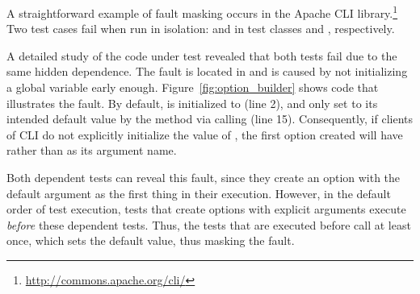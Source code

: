 A straightforward example of fault masking occurs in the Apache CLI
library.\footnote{\url{http://commons.apache.org/cli/}}
Two test cases fail when run in isolation:
 and  in test
classes  and ,
respectively.

A detailed study of the code under test revealed that both 
tests fail due to the same hidden dependence. The fault is located in 
 and is caused by not initializing a global
variable early enough.
Figure~\ref{fig:option_builder} shows code that
illustrates the fault. 
%
By default,
 is initialized to  (line 2), and only set to
its intended default value  by the  method
via calling  (line 15). 
Consequently, if clients of CLI do not explicitly initialize the value of
, the first option created will have  rather
than  as its argument name.

Both dependent tests
can reveal this fault, since they create an option with 
the default argument as the first thing in their execution. However,
in the default order of test execution, 
tests that create options with explicit arguments execute \emph{before} 
these dependent tests.
Thus, the tests that are executed before call  at least once, which
sets the default  value, thus masking the fault.

%

